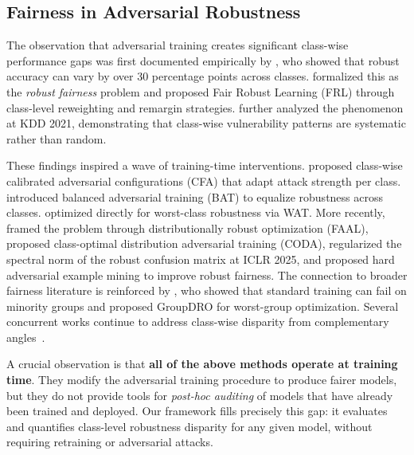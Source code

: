 \subsection{Fairness in Adversarial Robustness}
\label{sec:rw_fairness}

The observation that adversarial training creates significant class-wise performance gaps was first documented empirically by \citet{benz2021robustnessoddsfairnessempirical}, who showed that robust accuracy can vary by over 30 percentage points across classes. \citet{xu2021robustfairfairnessadversarial} formalized this as the \emph{robust fairness} problem and proposed Fair Robust Learning (FRL) through class-level reweighting and remargin strategies. \citet{tian2021analysisapplicationsclasswiserobustness} further analyzed the phenomenon at KDD 2021, demonstrating that class-wise vulnerability patterns are systematic rather than random.

These findings inspired a wave of training-time interventions. \citet{wei2023cfaclasswisecalibratedfair} proposed class-wise calibrated adversarial configurations (CFA) that adapt attack strength per class. \citet{sun2022improvingrobustfairnessbalance} introduced balanced adversarial training (BAT) to equalize robustness across classes. \citet{li2023watimproveworstclassrobustness} optimized directly for worst-class robustness via WAT. More recently, \citet{zhang2024fairnessawareadversariallearning} framed the problem through distributionally robust optimization (FAAL), \citet{zhi2025fairclasswiserobustnessclass} proposed class-optimal distribution adversarial training (CODA), \citet{jin2025enhancingrobustfairnessconfusional} regularized the spectral norm of the robust confusion matrix at ICLR 2025, and \citet{lin2023hardadversarialexamplemining} proposed hard adversarial example mining to improve robust fairness. The connection to broader fairness literature is reinforced by \citet{sagawa2020distributionallyrobustneuralnetworks}, who showed that standard training can fail on minority groups and proposed GroupDRO for worst-group optimization. Several concurrent works continue to address class-wise disparity from complementary angles~\citep{amerehi2025narrowingclasswiserobustnessgaps, zhu2026reducingclasswiseperformancedisparity, Mou2025-he}.

A crucial observation is that \textbf{all of the above methods operate at training time}. They modify the adversarial training procedure to produce fairer models, but they do not provide tools for \emph{post-hoc auditing} of models that have already been trained and deployed. Our framework fills precisely this gap: it evaluates and quantifies class-level robustness disparity for any given model, without requiring retraining or adversarial attacks.


